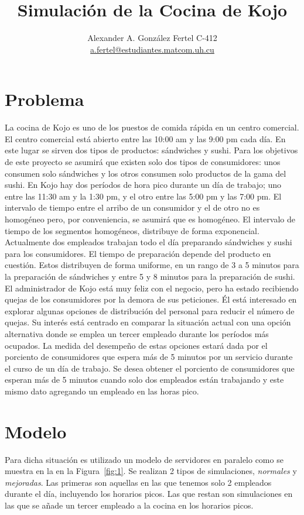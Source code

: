 \documentclass[a4paper, 10pt]{article}
\title{Simulación de la Cocina de Kojo}
\author{Alexander A. González Fertel C-412\\
		\href{mailto:a.fertel@estudiantes.matcom.uh.cu}{a.fertel@estudiantes.matcom.uh.cu}}
\date{}
\begin{document}
	\maketitle

	\section{Problema}
	La cocina de Kojo es uno de los puestos de comida rápida en un centro
	comercial. El centro comercial está abierto entre las 10:00 am y las 9:00 pm cada
	día. En este lugar se sirven dos tipos de productos: sándwiches y sushi. Para los
	objetivos de este proyecto se asumirá que existen solo dos tipos de consumidores:
	unos consumen solo sándwiches y los otros consumen solo productos de la gama
	del sushi. En Kojo hay dos períodos de hora pico durante un día de trabajo;
	uno entre las 11:30 am y la 1:30 pm, y el otro entre las 5:00 pm y las 7:00
	pm. El intervalo de tiempo entre el arribo de un consumidor y el de otro no es
	homogéneo pero, por conveniencia, se asumirá que es homogéneo. El intervalo
	de tiempo de los segmentos homogéneos, distribuye de forma exponencial.
	Actualmente dos empleados trabajan todo el día preparando sándwiches y
	sushi para los consumidores. El tiempo de preparación depende del producto en
	cuestión. Estos distribuyen de forma uniforme, en un rango de 3 a 5 minutos 
	para la preparación de sándwiches y entre 5 y 8 minutos para la preparación de
	sushi.
	El administrador de Kojo está muy feliz con el negocio, pero ha estado 
	recibiendo quejas de los consumidores por la demora de sus peticiones. Él está 
	interesado en explorar algunas opciones de distribución del personal para reducir
	el número de quejas. Su interés está centrado en comparar la situación actual con
	una opción alternativa donde se emplea un tercer empleado durante los períodos
	más ocupados. La medida del desempeño de estas opciones estará dada por el
	porciento de consumidores que espera más de 5 minutos por un servicio durante
	el curso de un día de trabajo.
	Se desea obtener el porciento de consumidores que esperan más de 5 minutos
	cuando solo dos empleados están trabajando y este mismo dato agregando un
	empleado en las horas pico.
	
	\section{Modelo}
	Para dicha situación es utilizado un modelo de servidores en paralelo como se muestra en la 
	en la Figura~\ref{fig:1}. Se realizan 2 tipos de simulaciones, {\itshape normales}
	y {\itshape mejoradas}. Las primeras son aquellas en las que tenemos solo 2 empleados
	durante el día, incluyendo los horarios picos. Las que restan son simulaciones en las
	que se añade un tercer empleado a la cocina en los horarios picos.
\end{document}
